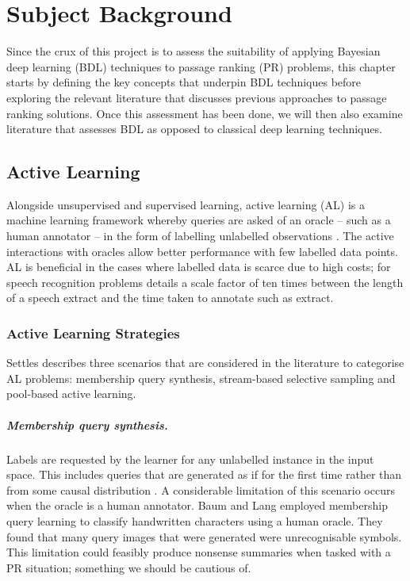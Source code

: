\documentclass[ %
                    author={James Stephenson},
                supervisor={Dr. Edwin Simpson},
                    degree={MSc},
                     title={PROJECT PLAN},
                  subtitle={ Bayesian Deep Learning For Extractive Test Summarisation},
                      type={},
                      year={2022}]{../additions/dissertation}
\begin{document}
		

		
	
	\chapter{Subject Background}
	\label{chap:literaturereview}
		
	Since the crux of this project is to assess the suitability of applying Bayesian deep learning (BDL) techniques to passage ranking (PR) problems, this chapter starts by defining the key concepts that underpin BDL techniques before exploring the relevant literature that discusses previous approaches to passage ranking solutions. Once this assessment has been done, we will then also examine literature that assesses BDL as opposed to classical deep learning techniques.
		
		
		\section{Active Learning}
		\label{chap:literaturereview:active}
		
		Alongside unsupervised and supervised learning, active learning (AL) is a machine learning framework whereby queries are asked of an oracle – such as a human annotator – in the form of labelling unlabelled observations \cite{Settles09}. The active interactions with oracles allow better performance with few labelled data points. AL is beneficial in the cases where labelled data is scarce due to high costs; for speech recognition problems \cite{Zhu05} details a scale factor of ten times between the length of a speech extract and the time taken to annotate such as extract.
		
			\subsection{Active Learning Strategies}
			\label{chap:literaturereview:active:strategies}
			
				Settles \cite{Settles09} describes three scenarios that are considered in the literature to categorise AL problems: membership query synthesis, stream-based selective sampling and pool-based active learning.

				\paragraph{Membership query synthesis.}  Labels are requested by the learner for any unlabelled instance in the input space. This includes queries that are generated as if for the first time rather than from some causal distribution \cite{Angluin88}. A considerable limitation of this scenario occurs when the oracle is a human annotator. Baum and Lang \cite{Baum92} employed membership query learning to classify handwritten characters using a human oracle. They found that many query images that were generated were unrecognisable symbols. This limitation could feasibly produce nonsense summaries when tasked with a PR situation; something we should be cautious of.
\end{document}
